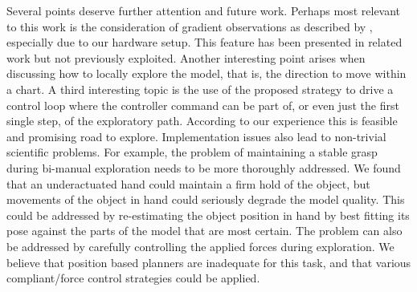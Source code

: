 Several points deserve further attention and future work. Perhaps most relevant to this work is the consideration of gradient observations as described by \cite{Solak2003Derivative}, especially due to our hardware setup. This feature has been presented in related work but not previously exploited. Another interesting point arises when discussing how to locally explore the model, that is, the direction to move within a chart. A third interesting topic is the use of the proposed strategy to drive a control loop where the controller command can be part of, or even just the first single step, of the exploratory path. According to our experience this is feasible and promising road to explore. Implementation issues also lead to non-trivial scientific problems. For example, the problem of maintaining a stable grasp during bi-manual exploration needs to be more thoroughly addressed. We found that an underactuated hand could maintain a firm hold of the object, but movements of the object in hand could seriously degrade the model quality. This could be addressed by re-estimating the object position in hand by best fitting its pose against the parts of the model that are most certain. The problem can also be addressed by carefully controlling the applied forces during exploration. We believe that position based planners are inadequate for this task, and that various compliant/force control strategies could be applied.


